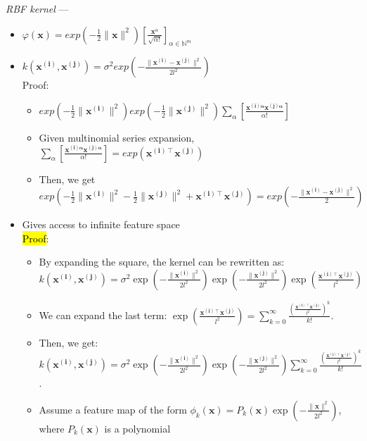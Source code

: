 \emph{RBF kernel} ---
\begin{itemize}
    \item $\varphi(\boldsymbol{x}) = exp ( -\frac{1}{2} \|\boldsymbol{x}\|^2 ) [ \frac{ \boldsymbol{x}^\alpha }{ \sqrt{\alpha!} } ]_{\alpha \in \mathbb{N}^m}$ 
    \item $k( \boldsymbol{x^{(i)}}, \boldsymbol{x^{(j)}} ) = \sigma^2 exp (- \frac{ \| \boldsymbol{x^{(i)}} - \boldsymbol{x^{(j)}} \|^2 }{ 2 l^2 } )$\\
    Proof:
    \begin{itemize}
        \item $exp ( -\frac{1}{2} \|\boldsymbol{x^{(i)}}\|^2 ) exp ( -\frac{1}{2} \|\boldsymbol{x^{(j)}}\|^2 ) \sum_\alpha [ \frac{ \boldsymbol{x^{(i)\alpha}} \boldsymbol{x^{(j)\alpha}} }{ \alpha! } ]$
        \item Given multinomial series expansion, $\sum_\alpha [ \frac{ \boldsymbol{x^{(i)\alpha}} \boldsymbol{x^{(j)\alpha}} }{ \alpha! } ] = exp(\boldsymbol{x^{(i)\intercal}} \boldsymbol{x^{(j)}})$
        \item Then, we get $exp ( -\frac{1}{2} \|\boldsymbol{x^{(i)}}\|^2  -\frac{1}{2} \|\boldsymbol{x^{(j)}}\|^2 + \boldsymbol{x^{(i)\intercal}} \boldsymbol{x^{(j)}}) = exp (- \frac{ \| \boldsymbol{x^{(i)}} - \boldsymbol{x^{(j)}} \|^2 }{ 2 } )$
    \end{itemize}
    \item Gives access to infinite feature space\\
    \hl{Proof}:
    \begin{itemize}
        \item By expanding the square, the kernel can be rewritten as:
        $ k(\boldsymbol{x^{(i)}}, \boldsymbol{x^{(j)}}) = \sigma^2 \exp(-\frac{\|\boldsymbol{x^{(i)}}\|^2}{2l^2}) \exp(-\frac{\|\boldsymbol{x^{(j)}}\|^2}{2l^2}) \exp(\frac{\boldsymbol{x^{(i)\intercal}} \boldsymbol{x^{(j)}}}{l^2}) $
        \item We can expand the last term:
        $ \exp(\frac{\boldsymbol{x^{(i)\intercal}} \boldsymbol{x^{(j)}}}{l^2}) = \sum_{k=0}^\infty \frac{(\frac{\boldsymbol{x^{(i)\intercal}} \boldsymbol{x^{(j)}}}{l^2})^k}{k!} $.
        \item Then, we get:
        $ k(\boldsymbol{x^{(i)}}, \boldsymbol{x^{(j)}}) = \sigma^2 \exp(-\frac{\|\boldsymbol{x^{(i)}}\|^2}{2l^2}) \exp(-\frac{\|\boldsymbol{x^{(j)}}\|^2}{2l^2}) \sum_{k=0}^\infty \frac{(\frac{\boldsymbol{x^{(i)\intercal}} \boldsymbol{x^{(j)}}}{l^2})^k}{k!} $.
        \item Assume a feature map of the form $ \phi_k(\boldsymbol{x}) = P_k(\boldsymbol{x}) \exp(-\frac{\|\boldsymbol{x}\|^2}{2l^2}) $, where $ P_k(\boldsymbol{x}) $ is a polynomial

\end{itemize}
\end{itemize}

